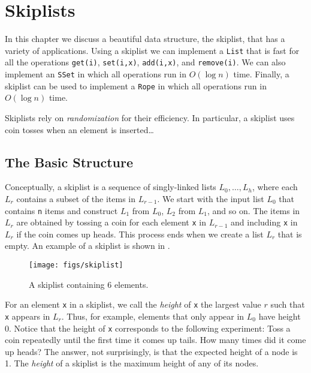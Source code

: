 \chapter{Skiplists}

In this chapter we discuss a beautiful data structure, the skiplist,
that has a variety of applications.  Using a skiplist we can implement
a \mbox{\texttt{List}} that is fast for all the operations \mbox{\texttt{get({\color{var}i})}}, \mbox{\texttt{set({\color{var}i},{\color{var}x})}},
\mbox{\texttt{add({\color{var}i},{\color{var}x})}}, and \mbox{\texttt{remove({\color{var}i})}}. We can also implement an \mbox{\texttt{SSet}} in which
all operations run in $O(\log n)$ time.  Finally, a skiplist can be used
to implement a \mbox{\texttt{Rope}} in which all operations run in $O(\log n)$ time.

Skiplists rely on \emph{randomization} for their efficiency.  In
particular, a skiplist uses coin tosses when an element is inserted\ldots

\section{The Basic Structure}

Conceptually, a skiplist is a sequence of singly-linked lists
$L_0,\ldots,L_h$, where each $L_r$ contains a subset of the items
in $L_{r-1}$.  We start with the input list $L_0$ that contains \mbox{\texttt{{\color{var}n}}}
items and construct $L_1$ from $L_0$, $L_2$ from $L_1$, and so on.
The items in $L_r$ are obtained by tossing a coin for each element \mbox{\texttt{{\color{var}x}}}
in $L_{r-1}$ and including \mbox{\texttt{{\color{var}x}}} in $L_r$ if the coin comes up heads.
This process ends when we create a list $L_r$ that is empty.  An example
of a skiplist is shown in .

\begin{figure}
  \begin{center}
    \texttt{[image: figs/skiplist]}
  \end{center}
  \caption{A skiplist containing 6 elements.}
\end{figure}

For an element \mbox{\texttt{{\color{var}x}}} in a skiplist, we call the \emph{height} of \mbox{\texttt{{\color{var}x}}} the
largest value $r$ such that \mbox{\texttt{{\color{var}x}}} appears in $L_r$.  Thus, for example,
elements that only appear in $L_0$ have height $0$.  Notice that the
height of \mbox{\texttt{{\color{var}x}}} corresponds to the following experiment:  Toss a coin
repeatedly until the first time it comes up tails.  How many times did
it come up heads?  The answer, not surprisingly, is that the expected
height of a node is 1.  The \emph{height} of a skiplist is the maximum
height of any of its nodes.

